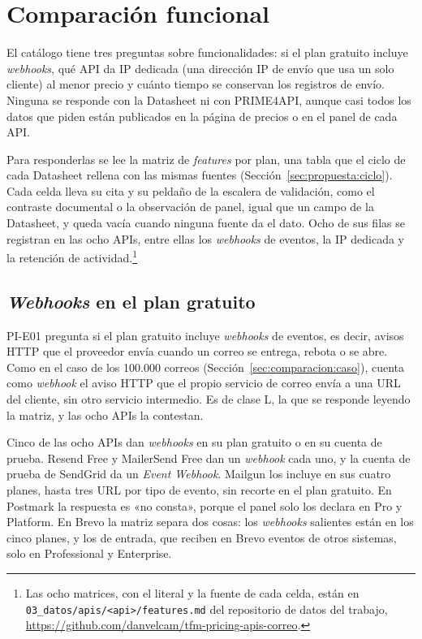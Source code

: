 \section{Comparación funcional}\label{sec:comparacion:funcional}\label{subsec:hallazgos:funcional}

El catálogo tiene tres preguntas sobre funcionalidades: si el plan gratuito incluye \textit{webhooks}, qué API da IP dedicada (una dirección IP de envío que usa un solo cliente) al menor precio y cuánto tiempo se conservan los registros de envío.
Ninguna se responde con la Datasheet ni con PRIME4API, aunque casi todos los datos que piden están publicados en la página de precios o en el panel de cada API.

Para responderlas se lee la matriz de \textit{features} por plan, una tabla que el ciclo de cada Datasheet rellena con las mismas fuentes (Sección~\ref{sec:propuesta:ciclo}).
Cada celda lleva su cita y su peldaño de la escalera de validación, como el contraste documental o la observación de panel, igual que un campo de la Datasheet, y queda vacía cuando ninguna fuente da el dato.
Ocho de sus filas se registran en las ocho APIs, entre ellas los \textit{webhooks} de eventos, la IP dedicada y la retención de actividad.\footnote{Las ocho matrices, con el literal y la fuente de cada celda, están en \texttt{03\_datos/\allowbreak apis/\allowbreak<api>/\allowbreak features.md} del repositorio de datos del trabajo, \url{https://github.com/danvelcam/tfm-pricing-apis-correo}.}

\subsection{\textit{Webhooks} en el plan gratuito}

PI-E01 pregunta si el plan gratuito incluye \textit{webhooks} de eventos, es decir, avisos HTTP que el proveedor envía cuando un correo se entrega, rebota o se abre.
Como en el caso de los 100.000 correos (Sección~\ref{sec:comparacion:caso}), cuenta como \textit{webhook} el aviso HTTP que el propio servicio de correo envía a una URL del cliente, sin otro servicio intermedio.
Es de clase L, la que se responde leyendo la matriz, y las ocho APIs la contestan.

Cinco de las ocho APIs dan \textit{webhooks} en su plan gratuito o en su cuenta de prueba.
Resend Free y MailerSend Free dan un \textit{webhook} cada uno, y la cuenta de prueba de SendGrid da un \textit{Event Webhook}.
Mailgun los incluye en sus cuatro planes, hasta tres URL por tipo de evento, sin recorte en el plan gratuito.
En Postmark la respuesta es «no consta», porque el panel solo los declara en Pro y Platform.
En Brevo la matriz separa dos cosas: los \textit{webhooks} salientes están en los cinco planes, y los de entrada, que reciben en Brevo eventos de otros sistemas, solo en Professional y Enterprise.

